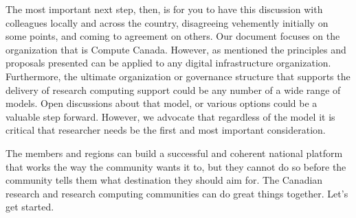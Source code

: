 \documentclass[11pt, letterpaper, twoside]{article}
\begin{document}
The most important next step, then, is for you to have this discussion
with colleagues locally and across the country, disagreeing vehemently
initially on some points, and coming to agreement on others. 
Our document focuses on the organization that is Compute Canada.
However, as mentioned the principles and proposals presented can be
applied to any digital infrastructure organization. Furthermore, the
ultimate organization or governance structure that supports the delivery
of research computing support could be any number of a wide range of
models. Open discussions about that model, or various options could be a
valuable step forward. However, we advocate that regardless of the model
it is critical that researcher needs be the first and most important
consideration.

The members and regions can build a successful and coherent national
platform that works the way the community wants it to, but they cannot
do so before the community tells them what destination they should aim
for. The Canadian research and research computing communities can do
great things together. Let's get started.

\newpage


%


\clearpage

\makebackcover
\end{document}
